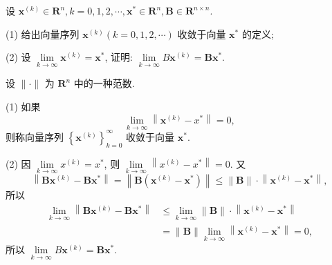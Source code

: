 \begin{tcolorbox}[enhanced,colback=10,colframe=9,breakable,coltitle=green!25!black,title=2024]
 设 $ \boldsymbol{x}^{(k)} \in \mathbf{R}^{n}, k=0,1,2, \cdots, \boldsymbol{x}^{*} \in \mathbf{R}^{n}, \boldsymbol{B} \in \mathbf{R}^{n \times n} $.

(1) 给出向量序列 $ \boldsymbol{x}^{(k)}(k=0,1,2, \cdots) $ 收敛于向量 $ \boldsymbol{x}^{*} $ 的定义;

(2) 设 $ \lim\limits _{k \rightarrow \infty} \boldsymbol{x}^{(k)}=\boldsymbol{x}^{*} $, 证明: $ \lim\limits _{k \rightarrow \infty} B \boldsymbol{x}^{(k)}=\boldsymbol{B} \boldsymbol{x}^{*} $.

 \tcblower

设 $ \|\cdot\| $ 为 $ \mathbf{R}^{n} $ 中的一种范数.

(1) 如果
$$
\lim _{k \rightarrow \infty}\left\|\boldsymbol{x}^{(k)}-x^{*}\right\|=0,
$$
则称向量序列 $ \left\{\boldsymbol{x}^{(k)}\right\}_{k=0}^{\infty} $ 收敛于向量 $ \boldsymbol{x}^{*} $.

(2) 因 $ \lim\limits _{k \rightarrow \infty} x^{(k)}=x^{*} $, 则 $ \lim\limits _{k \rightarrow \infty}\left\|x^{(k)}-x^{*}\right\|=0 $. 又
$$
\left\|\boldsymbol{B} \boldsymbol{x}^{(k)}-\boldsymbol{B} \boldsymbol{x}^{*}\right\|=\left\|\boldsymbol{B}\left(\boldsymbol{x}^{(k)}-\boldsymbol{x}^{*}\right)\right\| \leqslant\|\boldsymbol{B}\| \cdot\left\|\boldsymbol{x}^{(k)}-\boldsymbol{x}^{*}\right\|,
$$
所以
$$
\begin{aligned}
\lim _{k \rightarrow \infty}\left\|\boldsymbol{B} \boldsymbol{x}^{(k)}-\boldsymbol{B} \boldsymbol{x}^{*}\right\| & \leqslant \lim _{k \rightarrow \infty}\|\boldsymbol{B}\| \cdot\left\|\boldsymbol{x}^{(k)}-\boldsymbol{x}^{*}\right\| \\
& =\|\boldsymbol{B}\| \lim _{k \rightarrow \infty}\left\|\boldsymbol{x}^{(k)}-\boldsymbol{x}^{*}\right\|=0,
\end{aligned}
$$
所以 $ \lim\limits _{k \rightarrow \infty} B \boldsymbol{x}^{(k)}=\boldsymbol{B} \boldsymbol{x}^{*} $.

 \end{tcolorbox}


